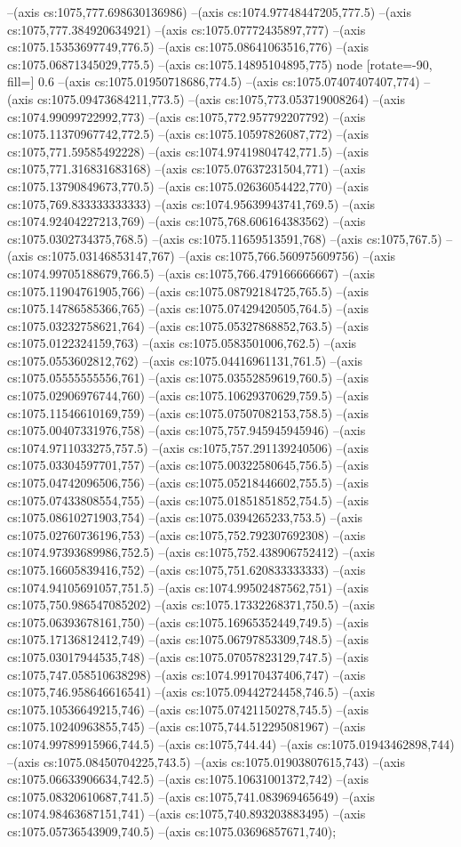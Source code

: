 --(axis cs:1075,777.698630136986)
--(axis cs:1074.97748447205,777.5)
--(axis cs:1075,777.384920634921)
--(axis cs:1075.07772435897,777)
--(axis cs:1075.15353697749,776.5)
--(axis cs:1075.08641063516,776)
--(axis cs:1075.06871345029,775.5)
--(axis cs:1075.14895104895,775) node [rotate=-90, fill=\bgcol] {0.6}
--(axis cs:1075.01950718686,774.5)
--(axis cs:1075.07407407407,774)
--(axis cs:1075.09473684211,773.5)
--(axis cs:1075,773.053719008264)
--(axis cs:1074.99099722992,773)
--(axis cs:1075,772.957792207792)
--(axis cs:1075.11370967742,772.5)
--(axis cs:1075.10597826087,772)
--(axis cs:1075,771.59585492228)
--(axis cs:1074.97419804742,771.5)
--(axis cs:1075,771.316831683168)
--(axis cs:1075.07637231504,771)
--(axis cs:1075.13790849673,770.5)
--(axis cs:1075.02636054422,770)
--(axis cs:1075,769.833333333333)
--(axis cs:1074.95639943741,769.5)
--(axis cs:1074.92404227213,769)
--(axis cs:1075,768.606164383562)
--(axis cs:1075.0302734375,768.5)
--(axis cs:1075.11659513591,768)
--(axis cs:1075,767.5)
--(axis cs:1075.03146853147,767)
--(axis cs:1075,766.560975609756)
--(axis cs:1074.99705188679,766.5)
--(axis cs:1075,766.479166666667)
--(axis cs:1075.11904761905,766)
--(axis cs:1075.08792184725,765.5)
--(axis cs:1075.14786585366,765)
--(axis cs:1075.07429420505,764.5)
--(axis cs:1075.03232758621,764)
--(axis cs:1075.05327868852,763.5)
--(axis cs:1075.0122324159,763)
--(axis cs:1075.0583501006,762.5)
--(axis cs:1075.0553602812,762)
--(axis cs:1075.04416961131,761.5)
--(axis cs:1075.05555555556,761)
--(axis cs:1075.03552859619,760.5)
--(axis cs:1075.02906976744,760)
--(axis cs:1075.10629370629,759.5)
--(axis cs:1075.11546610169,759)
--(axis cs:1075.07507082153,758.5)
--(axis cs:1075.00407331976,758)
--(axis cs:1075,757.945945945946)
--(axis cs:1074.9711033275,757.5)
--(axis cs:1075,757.291139240506)
--(axis cs:1075.03304597701,757)
--(axis cs:1075.00322580645,756.5)
--(axis cs:1075.04742096506,756)
--(axis cs:1075.05218446602,755.5)
--(axis cs:1075.07433808554,755)
--(axis cs:1075.01851851852,754.5)
--(axis cs:1075.08610271903,754)
--(axis cs:1075.0394265233,753.5)
--(axis cs:1075.02760736196,753)
--(axis cs:1075,752.792307692308)
--(axis cs:1074.97393689986,752.5)
--(axis cs:1075,752.438906752412)
--(axis cs:1075.16605839416,752)
--(axis cs:1075,751.620833333333)
--(axis cs:1074.94105691057,751.5)
--(axis cs:1074.99502487562,751)
--(axis cs:1075,750.986547085202)
--(axis cs:1075.17332268371,750.5)
--(axis cs:1075.06393678161,750)
--(axis cs:1075.16965352449,749.5)
--(axis cs:1075.17136812412,749)
--(axis cs:1075.06797853309,748.5)
--(axis cs:1075.03017944535,748)
--(axis cs:1075.07057823129,747.5)
--(axis cs:1075,747.058510638298)
--(axis cs:1074.99170437406,747)
--(axis cs:1075,746.958646616541)
--(axis cs:1075.09442724458,746.5)
--(axis cs:1075.10536649215,746)
--(axis cs:1075.07421150278,745.5)
--(axis cs:1075.10240963855,745)
--(axis cs:1075,744.512295081967)
--(axis cs:1074.99789915966,744.5)
--(axis cs:1075,744.44)
--(axis cs:1075.01943462898,744)
--(axis cs:1075.08450704225,743.5)
--(axis cs:1075.01903807615,743)
--(axis cs:1075.06633906634,742.5)
--(axis cs:1075.10631001372,742)
--(axis cs:1075.08320610687,741.5)
--(axis cs:1075,741.083969465649)
--(axis cs:1074.98463687151,741)
--(axis cs:1075,740.893203883495)
--(axis cs:1075.05736543909,740.5)
--(axis cs:1075.03696857671,740);

